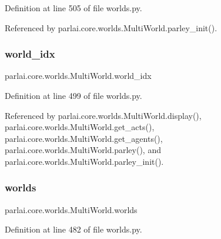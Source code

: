 Definition at line 505 of file worlds.\+py.



Referenced by parlai.\+core.\+worlds.\+Multi\+World.\+parley\+\_\+init().

\mbox{\label{classparlai_1_1core_1_1worlds_1_1MultiWorld_a3d2a0158d96bed4eead1e3b4138d5242}} 
\subsubsection{\texorpdfstring{world\+\_\+idx}{world\_idx}}
{\footnotesize\ttfamily parlai.\+core.\+worlds.\+Multi\+World.\+world\+\_\+idx}



Definition at line 499 of file worlds.\+py.



Referenced by parlai.\+core.\+worlds.\+Multi\+World.\+display(), parlai.\+core.\+worlds.\+Multi\+World.\+get\+\_\+acts(), parlai.\+core.\+worlds.\+Multi\+World.\+get\+\_\+agents(), parlai.\+core.\+worlds.\+Multi\+World.\+parley(), and parlai.\+core.\+worlds.\+Multi\+World.\+parley\+\_\+init().

\mbox{\label{classparlai_1_1core_1_1worlds_1_1MultiWorld_afd4cbc3c724de6b6bf8f55e6fc56964e}} 
\subsubsection{\texorpdfstring{worlds}{worlds}}
{\footnotesize\ttfamily parlai.\+core.\+worlds.\+Multi\+World.\+worlds}



Definition at line 482 of file worlds.\+py.



